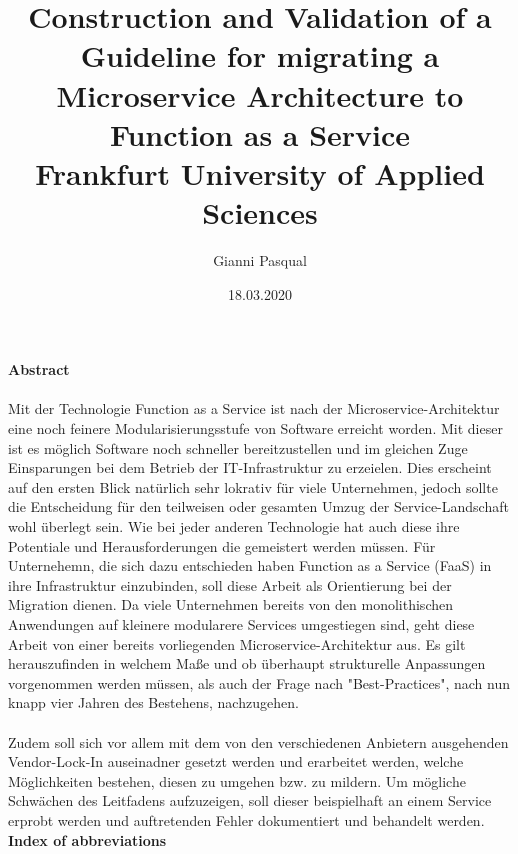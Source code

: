 \documentclass[11pt]{article}
\title{
{Construction and Validation of a Guideline for migrating a Microservice Architecture to Function as a Service}\\
{\large Frankfurt University of Applied Sciences}\\}
\author{Gianni Pasqual}
\date{18.03.2020}
\begin{document}
\maketitle
\newpage
{\Large \textbf {Abstract}}
\\\\ 
Mit der Technologie Function as a Service ist nach der Microservice-Architektur eine noch feinere Modularisierungsstufe von Software erreicht worden. Mit dieser ist es möglich Software noch schneller bereitzustellen und im gleichen Zuge Einsparungen bei dem Betrieb der IT-Infrastruktur zu erzeielen. Dies erscheint auf den ersten Blick natürlich sehr lokrativ für viele Unternehmen, jedoch sollte die Entscheidung für den teilweisen oder gesamten Umzug der Service-Landschaft wohl überlegt sein. Wie bei jeder anderen Technologie hat auch diese ihre Potentiale und Herausforderungen die gemeistert werden müssen. Für Unternehemn, die sich dazu entschieden haben Function as a Service (FaaS) in ihre Infrastruktur einzubinden, soll diese Arbeit als Orientierung bei der Migration dienen. Da viele Unternehmen bereits von den monolithischen Anwendungen auf kleinere modularere Services umgestiegen sind, geht diese Arbeit von einer bereits vorliegenden Microservice-Architektur aus. Es gilt herauszufinden in welchem Maße und ob überhaupt strukturelle Anpassungen vorgenommen werden müssen, als auch der Frage nach "Best-Practices", nach nun knapp vier Jahren des Bestehens, nachzugehen.
\\\\ 
Zudem soll sich vor allem mit dem von den verschiedenen Anbietern ausgehenden Vendor-Lock-In auseinadner gesetzt werden und erarbeitet werden, welche Möglichkeiten bestehen, diesen zu umgehen bzw. zu mildern. Um mögliche Schwächen des Leitfadens aufzuzeigen, soll dieser beispielhaft an einem Service erprobt werden und auftretenden Fehler dokumentiert und behandelt werden.
\newpage
{\Large \textbf {Index of abbreviations}}
\\\\ \\
\end{document}
